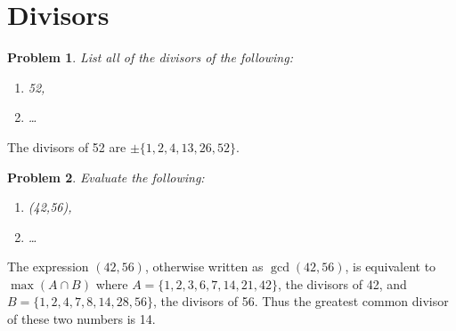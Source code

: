 \documentclass[12pt]{article}
\newtheorem{problem}{Problem}
\theoremstyle{remark}  %
\begin{document}
\section{Divisors}

\setcounter{problem}{11}
    \begin{problem}
        List all of the divisors of the following:
        \begin{enumerate}[label=(\alph*)]
            \item 52,
            \item \dots
        \end{enumerate}
    \end{problem}
    The divisors of 52 are $\pm\{1,2,4,13,26,52\}$.
\vspace{.5em}

\setcounter{problem}{13}
    \begin{problem}
        Evaluate the following:
        \begin{enumerate}[label=(\alph*)]
            \item (42,56),
            \item \dots
        \end{enumerate}
    \end{problem}
    The expression $(42,56)$, otherwise written as $\gcd(42,56)$, is equivalent to $\max(A\cap B)$ where $A=\{1,2,3,6,7,14,21,42\}$, the divisors of 42, and $B=\{1,2,4,7,8,14,28,56\}$, the divisors of 56. Thus the greatest common divisor of these two numbers is 14.
\vspace{.5em}
\end{document}
